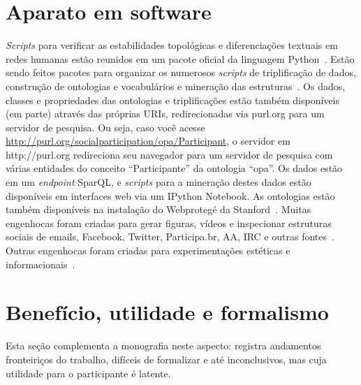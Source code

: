 \documentclass[a4paper,openright,12pt]{report} %
\begin{document}
\section{Aparato em software}
\emph{Scripts} para verificar as estabilidades topológicas e diferenciações textuais em redes humanas estão reunidos em um pacote oficial da linguagem Python~\cite{gmanePack}.
Estão sendo feitos pacotes para organizar os numerosos \emph{scripts}
de triplificação de dados, construção de ontologias e vocabulários e mineração das
estruturas~\cite{participation, percolation}. 
Os dados, classes e propriedades das
ontologias e triplificações estão também disponíveis (em parte)
através das próprias URIs, redirecionadas via purl.org
para um servidor de pesquisa. Ou seja,
caso você acesse \url{http://purl.org/socialparticipation/opa/Participant},
o servidor em http://purl.org redireciona seu navegador para
um servidor de pesquisa com várias entidades do conceito ``Participante''
da ontologia ``opa''.
Os dados estão em um \emph{endpoint} SparQL, e \emph{scripts} para a mineração
destes dados estão disponíveis em interfaces web via um
IPython Notebook. As ontologias estão também disponíveis
na instalação do Webprotegé da Stanford~\cite{pnud5}.
Muitas engenhocas foram criadas para gerar figuras, vídeos e inspecionar
estruturas sociais de emails, Facebook, Twitter, Participa.br, AA, IRC e outras
fontes~\cite{appGMANE,social,ensaaio,ensaio}.
Outras engenhocas foram criadas para experimentações estéticas e
informacionais~\cite{mmissa,ocupagov,gmane,mm}.

\section{Benefício, utilidade e formalismo}
Esta seção complementa a monografia neste aspecto:
registra andamentos fronteiriços do trabalho, difíceis de formalizar e até inconclusivos,
mas cuja utilidade para o participante é latente.
\end{document}
